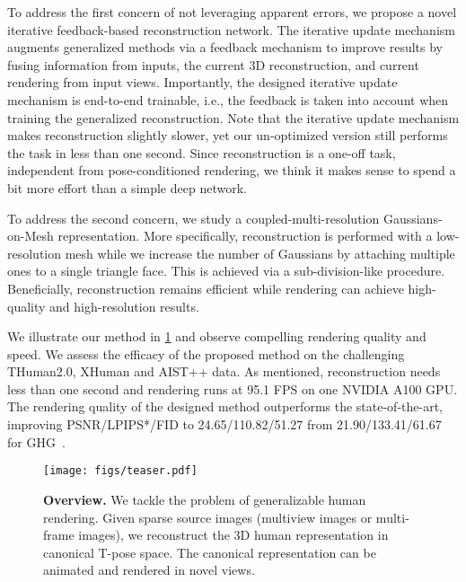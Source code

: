 To address the first concern of not leveraging apparent errors, we propose a novel iterative feedback-based reconstruction network. The iterative update mechanism augments generalized methods via a feedback mechanism to improve results by fusing information from inputs, the current 3D reconstruction, and current rendering from input views. Importantly, the designed iterative update mechanism is end-to-end trainable, i.e., the feedback is taken into account when training the generalized reconstruction. Note that the iterative update mechanism makes reconstruction slightly slower,
yet our un-optimized version still performs the task in less than one second. Since reconstruction is a one-off task, independent from pose-conditioned rendering, we think it makes sense to spend a bit more effort than a simple deep network. %

To address the second concern, we study a coupled-multi-resolution Gaussians-on-Mesh representation. More specifically, reconstruction is performed with a low-resolution mesh while we increase the number of Gaussians by attaching multiple ones to a single triangle face. This is achieved via a sub-division-like procedure. Beneficially, reconstruction remains efficient while rendering can achieve high-quality and high-resolution results.

We illustrate our method in \cref{fig:teaser} and observe compelling rendering quality and  speed. We assess the efficacy of the proposed method on the challenging THuman2.0, XHuman and AIST++ data. As mentioned, reconstruction needs less than one second and rendering runs at 95.1 FPS on one NVIDIA A100 GPU. The rendering quality of the designed method outperforms the state-of-the-art, improving PSNR/LPIPS*/FID to 24.65/110.82/51.27 from 21.90/133.41/61.67 for GHG~\citep{kwon2024ghg}.
\begin{figure}[t]
    \centering
    \texttt{[image: figs/teaser.pdf]} \vspace{-0.5cm}
    \caption{\textbf{Overview.} We tackle the problem of generalizable human rendering. Given sparse source images (multiview images or multi-frame images), we reconstruct the 3D human representation in canonical  T-pose space. The canonical representation can be animated  and rendered in novel views.} \vspace{-0.6cm}
    \label{fig:teaser}
\end{figure}
